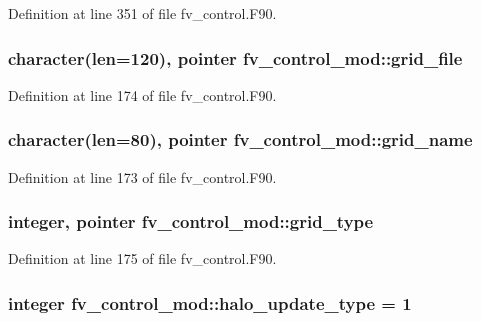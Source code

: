Definition at line 351 of file fv\-\_\-control.\-F90.

\subsubsection[{grid\-\_\-file}]{\setlength{\rightskip}{0pt plus 5cm}character(len=120), pointer fv\-\_\-control\-\_\-mod\-::grid\-\_\-file\hspace{0.3cm}{\ttfamily [private]}}\label{classfv__control__mod_ab66042467e04279683c403c49e70d9a4}


Definition at line 174 of file fv\-\_\-control.\-F90.

\subsubsection[{grid\-\_\-name}]{\setlength{\rightskip}{0pt plus 5cm}character(len=80), pointer fv\-\_\-control\-\_\-mod\-::grid\-\_\-name\hspace{0.3cm}{\ttfamily [private]}}\label{classfv__control__mod_ab4d0c803dedf251c5be32d99a5aa8c5d}


Definition at line 173 of file fv\-\_\-control.\-F90.

\subsubsection[{grid\-\_\-type}]{\setlength{\rightskip}{0pt plus 5cm}integer, pointer fv\-\_\-control\-\_\-mod\-::grid\-\_\-type\hspace{0.3cm}{\ttfamily [private]}}\label{classfv__control__mod_ab429e3c6b455d8f4b4a33bb0b38e3377}


Definition at line 175 of file fv\-\_\-control.\-F90.

\subsubsection[{halo\-\_\-update\-\_\-type}]{\setlength{\rightskip}{0pt plus 5cm}integer fv\-\_\-control\-\_\-mod\-::halo\-\_\-update\-\_\-type = 1\hspace{0.3cm}{\ttfamily [private]}}\label{classfv__control__mod_a1806aedab0a728a6bf6b8fed41e121a9}


